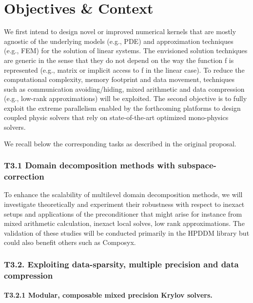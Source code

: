 

\section{Objectives \& Context}

We first intend to design novel or improved numerical kernels that are mostly agnostic of the
underlying models (e.g., PDE) and approximation techniques (e.g., FEM) for the solution of linear
systems. The envisioned solution techniques are generic in the sense that they do not depend on the
way the function f is represented (e.g., matrix or implicit access to f in the linear case). To reduce the
computational complexity, memory footprint and data movement, techniques such as communication
avoiding/hiding, mixed arithmetic and data compression (e.g., low-rank approximations) will be
exploited. The second objective is to fully exploit the extreme parallelism enabled by the forthcoming
platforms to design coupled physic solvers that rely on state-of-the-art optimized mono-physics
solvers.

We recall below the corresponding tasks as described in the original proposal. 


\subsubsection*{T3.1 Domain decomposition methods with subspace-correction}

 To enhance the scalability of
multilevel domain decomposition methods, we will investigate theoretically and experiment their
robustness with respect to inexact setups and applications of the preconditioner that might arise for
instance from mixed arithmetic calculation, inexact local solves, low rank approximations. The
validation of these studies will be conducted primarily in the HPDDM library but could also benefit
others such as Composyx.
\subsubsection*{T3.2. Exploiting data-sparsity, multiple precision and data compression}
\paragraph*{T3.2.1 Modular, composable mixed precision Krylov solvers. }

